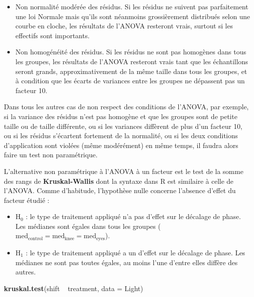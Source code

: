 \documentclass[a4paperpaper,]{article}
\newenvironment{Shaded}{\begin{snugshade}}{\end{snugshade}}
\newcommand{\DataTypeTok}[1]{\textcolor[rgb]{0.00,0.34,0.68}{#1}}
\newcommand{\KeywordTok}[1]{\textcolor[rgb]{0.12,0.11,0.11}{\textbf{#1}}}
\newcommand{\NormalTok}[1]{\textcolor[rgb]{0.12,0.11,0.11}{#1}}
\newcommand{\OperatorTok}[1]{\textcolor[rgb]{0.12,0.11,0.11}{#1}}
\newcommand{\StringTok}[1]{\textcolor[rgb]{0.75,0.01,0.01}{#1}}
\providecommand{\tightlist}{%
  \setlength{\itemsep}{0pt}\setlength{\parskip}{0pt}}
\begin{document}
\begin{itemize}
\tightlist
\item
  Non normalité modérée des résidus. Si les résidus ne suivent pas parfaitement une loi Normale mais qu'ils sont néanmoins grossièrement distribués selon une courbe en cloche, les résultats de l'ANOVA resteront vrais, surtout si les effectifs sont importants.
\item
  Non homogénéité des résidus. Si les résidus ne sont pas homogènes dans tous les groupes, les résultats de l'ANOVA resteront vrais tant que les échantillons seront grands, approximativement de la même taille dans tous les groupes, et à condition que les écarts de variances entre les groupes ne dépassent pas un facteur 10.
\end{itemize}

Dans tous les autres cas de non respect des conditions de l'ANOVA, par exemple, si la variance des résidus n'est pas homogène et que les groupes sont de petite taille ou de taille différente, ou si les variances diffèrent de plus d'un facteur 10, ou si les résidus s'écartent fortement de la normalité, ou si les deux conditions d'application sont violées (même modérément) en même temps, il faudra alors faire un test non paramétrique.

L'alternative non paramétrique à l'ANOVA à un facteur est le test de la somme des rangs de \textbf{Kruskal-Wallis} dont la syntaxe dans R est similaire à celle de l'ANOVA. Comme d'habitude, l'hypothèse nulle concerne l'absence d'effet du facteur étudié :

\begin{itemize}
\tightlist
\item
  H\(_0\) : le type de traitement appliqué n'a pas d'effet sur le décalage de phase. Les médianes sont égales dans tous les groupes (\(\textrm{med}_\textrm{control} = \textrm{med}_\textrm{knee} = \textrm{med}_\textrm{eyes}\)).
\item
  H\(_1\) : le type de traitement appliqué a un d'effet sur le décalage de phase. Les médianes ne sont pas toutes égales, au moins l'une d'entre elles diffère des autres.
\end{itemize}

\begin{Shaded}
\begin{Highlighting}[]
\KeywordTok{kruskal.test}\NormalTok{(shift }\OperatorTok{~}\StringTok{ }\NormalTok{treatment, }\DataTypeTok{data =}\NormalTok{ Light)}
\end{Highlighting}
\end{Shaded}
\end{document}
